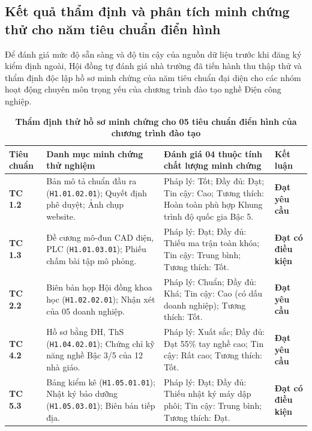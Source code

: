 \subsection{Kết quả thẩm định và phân tích minh chứng thử cho năm tiêu chuẩn điển hình}

Để đánh giá mức độ sẵn sàng và độ tin cậy của nguồn dữ liệu trước khi đăng ký kiểm định ngoài, Hội đồng tự đánh giá nhà trường đã tiến hành thu thập thử và thẩm định độc lập hồ sơ minh chứng của năm tiêu chuẩn đại diện cho các nhóm hoạt động chuyên môn trọng yếu của chương trình đào tạo nghề Điện công nghiệp.

\begin{table}[htbp]
\centering
\footnotesize
\setlength{\tabcolsep}{3.5pt}
\renewcommand{\arraystretch}{1.15}
\caption{\textbf{Thẩm định thử hồ sơ minh chứng cho 05 tiêu chuẩn điển hình của chương trình đào tạo}}
\label{tab:bang2_3}
\vspace{0.2cm}
\begin{tabularx}{\textwidth}{l X X l}
\toprule
\textbf{Tiêu chuẩn} & \textbf{Danh mục minh chứng thử nghiệm} & \textbf{Đánh giá 04 thuộc tính chất lượng minh chứng} & \textbf{Kết luận} \\
\midrule
\textbf{TC 1.2} & Bản mô tả chuẩn đầu ra (\texttt{H1.01.02.01}); Quyết định phê duyệt; Ảnh chụp website. & Pháp lý: Tốt; Đầy đủ: Đạt; Tin cậy: Cao; Tương thích: Hoàn toàn phù hợp Khung trình độ quốc gia Bậc 5. & \textbf{Đạt yêu cầu} \\
\textbf{TC 1.3} & Đề cương mô-đun CAD điện, PLC (\texttt{H1.01.03.01}); Phiếu chấm bài tập mô phỏng. & Pháp lý: Đạt; Đầy đủ: Thiếu ma trận toàn khóa; Tin cậy: Trung bình; Tương thích: Tốt. & \textbf{Đạt có điều kiện} \\
\textbf{TC 2.2} & Biên bản họp Hội đồng khoa học (\texttt{H1.02.02.01}); Nhận xét của 05 doanh nghiệp. & Pháp lý: Chuẩn; Đầy đủ: Khá; Tin cậy: Cao (có dấu doanh nghiệp); Tương thích: Tốt. & \textbf{Đạt yêu cầu} \\
\textbf{TC 4.2} & Hồ sơ bằng ĐH, ThS (\texttt{H1.04.02.01}); Chứng chỉ kỹ năng nghề Bậc 3/5 của 12 nhà giáo. & Pháp lý: Xuất sắc; Đầy đủ: Đạt 55\% tay nghề cao; Tin cậy: Rất cao; Tương thích: Tốt. & \textbf{Đạt yêu cầu} \\
\textbf{TC 5.3} & Bảng kiểm kê (\texttt{H1.05.01.01}); Nhật ký bảo dưỡng (\texttt{H1.05.03.01}); Biên bản tiếp địa. & Pháp lý: Đạt; Đầy đủ: Thiếu nhật ký máy dập phôi; Tin cậy: Trung bình; Tương thích: Đạt. & \textbf{Đạt có điều kiện} \\
\bottomrule
\end{tabularx}
\end{table}

